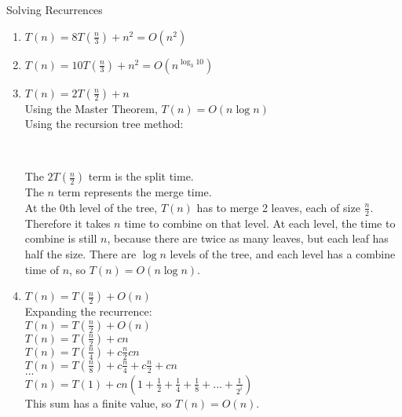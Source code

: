 \documentclass[12pt,twoside]{article}
\begin{document}
\begin{problems}
\begin{problemparts}
\problempart Solving Recurrences
\begin{enumerate}
	\item $T(n) = 8T(\frac{n}{3})+ n^2 = O(n^2)$
	\item $T(n) = 10T(\frac{n}{3})+ n^2 = O(n^{\log_3 10})$
	\item $T(n) = 2T(\frac{n}{2})+ n$ \\
	Using the Master Theorem, $T(n)=O(n \log n)$ \\
	Using the recursion tree method: \\
	
	
 \\
\bigskip

The $2T(\frac{n}{2})$ term is the split time.\\
The $n$ term represents the merge time. \\
 
At the 0th level of the tree, $T(n)$ has to merge 2 leaves, each of size $\frac{n}{2}$. Therefore it takes $n$ time to combine on that level. At each level, the time to combine is still $n$, because there are twice as many leaves, but each leaf has half the size. There are $\log n$ levels of the tree, and each level has a combine time of $n$, so $T(n) = O(n \log n)$.

	\vspace{5mm}
	
	\item $T(n) = T(\frac{n}{2})+ O(n)$ \\
	Expanding the recurrence: \\
	$T(n) = T(\frac{n}{2}) + O(n)$ \\
	$T(n) = T(\frac{n}{2}) + cn $\\
	$T(n) = T(\frac{n}{4}) + c\frac{n}{2} cn$ \\
	$T(n) = T(\frac{n}{8}) + c\frac{n}{4} + c\frac{n}{2} + cn $\\
	$...$ \\
	$T(n) = T(1) + cn(1 + \frac{1}{2} + \frac{1}{4} + \frac{1}{8} + ... + \frac{1}{2^i})$ \\
	This sum has a finite value, so $T(n) = O(n)$.


\end{enumerate}
\end{problemparts}
\end{problems}
\end{document}
